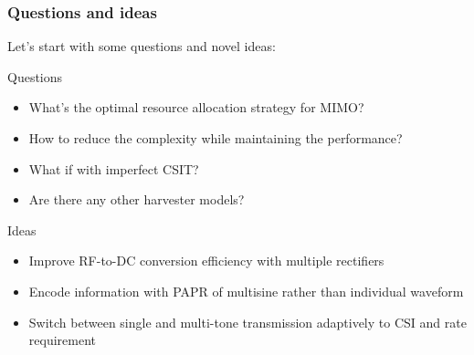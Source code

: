 \documentclass{beamer}
\begin{document}
\begin{frame}
\frametitle{Questions and ideas}

Let's start with some questions and novel ideas:

\begin{block}{Questions}
\begin{itemize}
  \item What's the optimal resource allocation strategy for MIMO?
  \item How to reduce the complexity while maintaining the performance?
  \item What if with imperfect CSIT?
  \item Are there any other harvester models?
\end{itemize}
\end{block}

\begin{block}{Ideas}
\begin{itemize}
  \item Improve RF-to-DC conversion efficiency with multiple rectifiers \cite{Ma2019}
  \item Encode information with PAPR of multisine rather than individual waveform \cite{Park2018, Krikidis2019}
  \item Switch between single and multi-tone transmission adaptively to CSI and rate requirement \cite{Park2018}
\end{itemize}
\end{block}

\end{frame}



\end{document}
